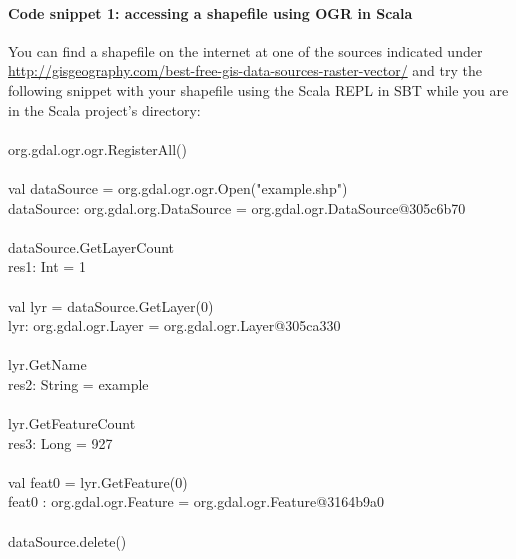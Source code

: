 \documentclass {article}
\begin{document}
\paragraph{ Code snippet 1: accessing a shapefile using OGR in Scala} 
You can find a shapefile on the internet at one of the sources indicated under \href{http://gisgeography.com/best-free-gis-data-sources-raster-vector/}{http://gisgeography.com/best-free-gis-data-sources-raster-vector/} and try the following snippet with your shapefile using the Scala REPL in SBT while you are in the Scala project's directory: \\
\\
org.gdal.ogr.ogr.RegisterAll() \\
\\
val dataSource = org.gdal.ogr.ogr.Open("example.shp")\\  
dataSource: org.gdal.org.DataSource = org.gdal.ogr.DataSource@305c6b70 \\
\\
dataSource.GetLayerCount \\
res1: Int = 1 \\
\\
val lyr = dataSource.GetLayer(0) \\
lyr: org.gdal.ogr.Layer = org.gdal.ogr.Layer@305ca330 \\ 
\\
lyr.GetName \\
res2: String = example \\
\\
lyr.GetFeatureCount \\
res3: Long = 927 \\
\\
val feat0 = lyr.GetFeature(0) \\
feat0 : org.gdal.ogr.Feature = org.gdal.ogr.Feature@3164b9a0\\
\\
dataSource.delete() \\
\end{document}
